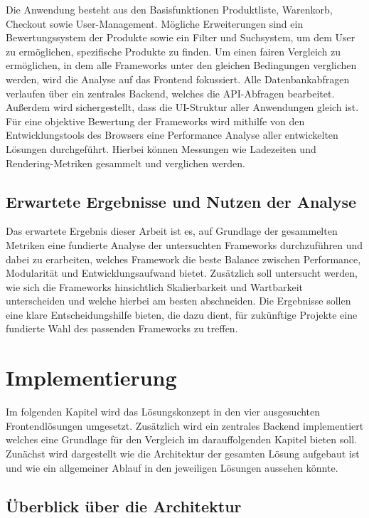 \documentclass[oneside]{ausarbeitung}
\begin{document}
Die Anwendung besteht aus den Basisfunktionen Produktliste, Warenkorb, Checkout sowie User-Management. Mögliche Erweiterungen sind ein Bewertungssystem der Produkte sowie ein Filter und Suchsystem, um dem User zu ermöglichen, spezifische Produkte zu finden. 
Um einen fairen Vergleich zu ermöglichen, in dem alle Frameworks unter den gleichen Bedingungen verglichen werden, wird die Analyse auf das Frontend fokussiert. Alle Datenbankabfragen verlaufen über ein zentrales Backend, welches die API-Abfragen bearbeitet. 
Außerdem wird sichergestellt, dass die UI-Struktur aller Anwendungen gleich ist. 
Für eine objektive Bewertung der Frameworks wird mithilfe von den Entwicklungstools des Browsers eine Performance Analyse aller entwickelten Lösungen durchgeführt. Hierbei können Messungen wie Ladezeiten und Rendering-Metriken gesammelt und verglichen werden. 

\section{Erwartete Ergebnisse und Nutzen der Analyse}

Das erwartete Ergebnis dieser Arbeit ist es, auf Grundlage der gesammelten Metriken eine fundierte Analyse der untersuchten Frameworks durchzuführen und dabei zu erarbeiten, welches Framework die beste Balance zwischen Performance, Modularität und Entwicklungsaufwand bietet.
Zusätzlich soll untersucht werden, wie sich die Frameworks hinsichtlich Skalierbarkeit und Wartbarkeit unterscheiden und welche hierbei am besten abschneiden.
Die Ergebnisse sollen eine klare Entscheidungshilfe bieten, die dazu dient, für zukünftige Projekte eine fundierte Wahl des passenden Frameworks zu treffen.

\chapter{Implementierung}
\label{cha:implementierung}

Im folgenden Kapitel wird das Lösungskonzept in den vier ausgesuchten Frontendlösungen umgesetzt. Zusätzlich wird ein zentrales Backend implementiert welches eine Grundlage für den Vergleich im darauffolgenden Kapitel bieten soll. Zunächst wird dargestellt wie die Architektur der gesamten Lösung aufgebaut ist und wie ein allgemeiner Ablauf in den jeweiligen Lösungen aussehen könnte. 

\section{Überblick über die Architektur}
\label{sec:architektur}
\end{document}
